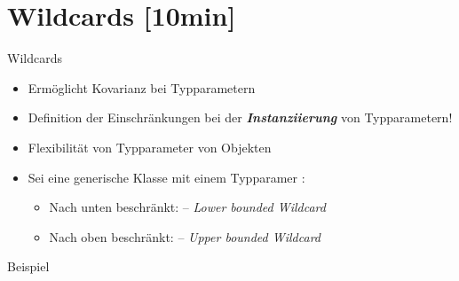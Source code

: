 \documentclass{../tuda-beamer}
\begin{document}
    \begin{frame}[c]
        
        
    \end{frame}


    \section{Wildcards [10min]}
    \label{sec:wildcards}
    \begin{frame}[c]{Wildcards}
        \begin{itemize}
            \item Ermöglicht Kovarianz bei Typparametern
            \item Definition der Einschränkungen bei der \textbf{\emph{Instanziierung}} von
            Typparametern!
            \item Flexibilität von Typparameter von Objekten
            \item Sei  eine generische Klasse mit einem Typparamer :
            \begin{itemize}
                \item Nach unten beschränkt: \underline{}\inlinejava{>}-- \emph{Lower bounded Wildcard}
                \item Nach oben beschränkt: \underline{}\inlinejava{>}-- \emph{Upper bounded Wildcard}
            \end{itemize}
        \end{itemize}
    \end{frame}

    \begin{frame}[c]{Beispiel}
        
    \end{frame}
\end{document}
